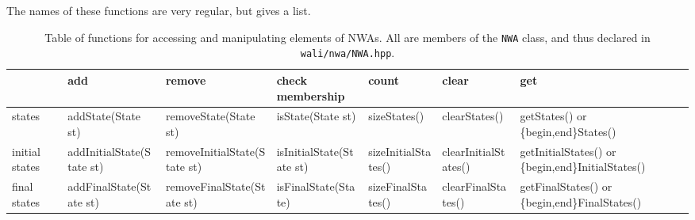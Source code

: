 The names of these functions are very regular, but
 gives a list.

\begin{sidewaystable}\sffamily\footnotesize
\begin{threeparttable}
\caption{\vbox{Table of functions for accessing and manipulating elements
  of NWAs. All are members of the \texttt{NWA} class, and thus declared in \texttt{wali/nwa/NWA.hpp}. }
}
\label{Ta:simple-functions}
\begin{tabular}{p{0.75in}p{1.55in}p{1.6in}p{1.35in}p{1.27in}p{1.2in}p{1.5in}}
\toprule
                 &  add\tnote{1}                            &  remove\tnote{1}                          &  check membership\tnote{3} &  count                &  clear                     &  get\tnote{4}                 \\
\hline\hline %
states           &  addState(State st)                      &  removeState(State st)\tnote{5}           &  isState(State st)         &  sizeStates()         &  clearStates()\tnote{5}    &  getStates() or \newline
                                                                                                                                                                                             \{begin,end\}States()        \\
initial \newline
states           &  addInitialState(State st)               &  removeInitialState(State st)             &  isInitialState(State st)  &  sizeInitialStates()  &  clearInitialStates()      &  getInitialStates() or \newline
                                                                                                                                                                                             \{begin,end\}InitialStates() \\
final
\newline  states &  addFinalState(State st)                 &  removeFinalState(State st)               &  isFinalState(State)       &  sizeFinalStates()    &  clearFinalStates()        &  getFinalStates() or \newline
                                                                                                                                                                                             \{begin,end\}FinalStates()    \\

\end{tabular}
\end{threeparttable}
\end{sidewaystable}
